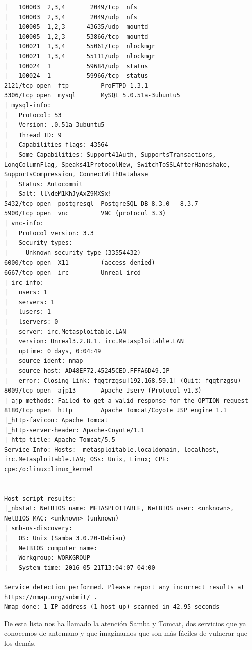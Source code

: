 \documentclass[a4paper,12pt]{scrartcl}
\begin{document}
\begin{lstlisting}[breaklines]
|   100003  2,3,4       2049/tcp  nfs
|   100003  2,3,4       2049/udp  nfs
|   100005  1,2,3      43635/udp  mountd
|   100005  1,2,3      53866/tcp  mountd
|   100021  1,3,4      55061/tcp  nlockmgr
|   100021  1,3,4      55111/udp  nlockmgr
|   100024  1          59684/udp  status
|_  100024  1          59966/tcp  status
2121/tcp open  ftp         ProFTPD 1.3.1
3306/tcp open  mysql       MySQL 5.0.51a-3ubuntu5
| mysql-info: 
|   Protocol: 53
|   Version: .0.51a-3ubuntu5
|   Thread ID: 9
|   Capabilities flags: 43564
|   Some Capabilities: Support41Auth, SupportsTransactions, LongColumnFlag, Speaks41ProtocolNew, SwitchToSSLAfterHandshake, SupportsCompression, ConnectWithDatabase
|   Status: Autocommit
|_  Salt: ll\deM1KhJyAxZ9MXSx!
5432/tcp open  postgresql  PostgreSQL DB 8.3.0 - 8.3.7
5900/tcp open  vnc         VNC (protocol 3.3)
| vnc-info: 
|   Protocol version: 3.3
|   Security types: 
|_    Unknown security type (33554432)
6000/tcp open  X11         (access denied)
6667/tcp open  irc         Unreal ircd
| irc-info: 
|   users: 1
|   servers: 1
|   lusers: 1
|   lservers: 0
|   server: irc.Metasploitable.LAN
|   version: Unreal3.2.8.1. irc.Metasploitable.LAN 
|   uptime: 0 days, 0:04:49
|   source ident: nmap
|   source host: AD48EF72.45245CED.FFFA6D49.IP
|_  error: Closing Link: fqqtrzgsu[192.168.59.1] (Quit: fqqtrzgsu)
8009/tcp open  ajp13       Apache Jserv (Protocol v1.3)
|_ajp-methods: Failed to get a valid response for the OPTION request
8180/tcp open  http        Apache Tomcat/Coyote JSP engine 1.1
|_http-favicon: Apache Tomcat
|_http-server-header: Apache-Coyote/1.1
|_http-title: Apache Tomcat/5.5
Service Info: Hosts:  metasploitable.localdomain, localhost, irc.Metasploitable.LAN; OSs: Unix, Linux; CPE: cpe:/o:linux:linux_kernel


Host script results:
|_nbstat: NetBIOS name: METASPLOITABLE, NetBIOS user: <unknown>, NetBIOS MAC: <unknown> (unknown)
| smb-os-discovery: 
|   OS: Unix (Samba 3.0.20-Debian)
|   NetBIOS computer name: 
|   Workgroup: WORKGROUP
|_  System time: 2016-05-21T13:04:07-04:00

Service detection performed. Please report any incorrect results at https://nmap.org/submit/ .
Nmap done: 1 IP address (1 host up) scanned in 42.95 seconds
\end{lstlisting}

De esta lista nos ha llamado la atención Samba y Tomcat, dos servicios que ya conocemos de antemano y que imaginamos que son más fáciles de vulnerar que los demás.

\vspace{10pt}
\end{document}

